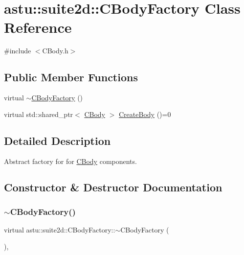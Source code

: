 \hypertarget{classastu_1_1suite2d_1_1CBodyFactory}{}\section{astu\+:\+:suite2d\+:\+:C\+Body\+Factory Class Reference}
\label{classastu_1_1suite2d_1_1CBodyFactory}


{\ttfamily \#include $<$C\+Body.\+h$>$}

\subsection*{Public Member Functions}
\begin{DoxyCompactItemize}
\item 
virtual \hyperlink{classastu_1_1suite2d_1_1CBodyFactory_a0607b0c1bac50c795c16d3793a4a7822}{$\sim$\+C\+Body\+Factory} ()
\item 
virtual std\+::shared\+\_\+ptr$<$ \hyperlink{classastu_1_1suite2d_1_1CBody}{C\+Body} $>$ \hyperlink{classastu_1_1suite2d_1_1CBodyFactory_a01cc829fc9c60f772f0621b2a8e88183}{Create\+Body} ()=0
\end{DoxyCompactItemize}


\subsection{Detailed Description}
Abstract factory for for \hyperlink{classastu_1_1suite2d_1_1CBody}{C\+Body} components. 

\subsection{Constructor \& Destructor Documentation}
\mbox{\label{classastu_1_1suite2d_1_1CBodyFactory_a0607b0c1bac50c795c16d3793a4a7822}} 
\subsubsection{\texorpdfstring{$\sim$\+C\+Body\+Factory()}{~CBodyFactory()}}
{\footnotesize\ttfamily virtual astu\+::suite2d\+::\+C\+Body\+Factory\+::$\sim$\+C\+Body\+Factory (\begin{DoxyParamCaption}{ }\end{DoxyParamCaption})\hspace{0.3cm}{\ttfamily [inline]}, {\ttfamily [virtual]}}

